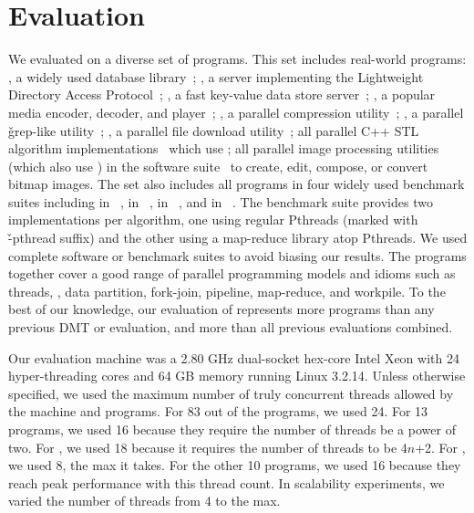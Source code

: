 \section{Evaluation} \label{sec:parrot-eval}

We evaluated \parrot on a diverse set of \nprog programs. This set
includes \nrealprog real-world programs: \bdb, a widely used database
library~\cite{berkeleydb}; \openldap, a server implementing the
Lightweight Directory Access Protocol~\cite{openldap}; \redis, a fast
key-value data store server~\cite{redis}; \mplayer, a popular media
encoder, decoder, and player~\cite{mplayer}; \pbzip, a parallel
compression utility~\cite{pbzip2}; \pfscan, a parallel \v{grep}-like
utility~\cite{pfscan}; \aget, a parallel file download
utility~\cite{aget}; all \nstl parallel C++ STL algorithm
implementations~\cite{parallel-stl} which use \openmp; all \nimagick
parallel image processing utilities (which also use \openmp) in the
\imagick software suite~\cite{imagick} to create, edit, compose, or
convert bitmap images.  The set also includes all \nbenchmarks programs in
four widely used benchmark suites including \nparsec in
\parsec~\cite{parsec}, \nphoenix in
\phoenix~\cite{phoenix-benchmarks}, \nsplash in
\splashx~\cite{splashx}, and \nnpb in \npb~\cite{npb}.  The \phoenix
benchmark suite provides two implementations per algorithm, one using
regular Pthreads (marked with \v{-pthread} suffix) and the other using
a map-reduce library atop Pthreads.  We used complete software or
benchmark suites to avoid biasing our results.  The programs together
cover a good range of parallel programming models and idioms such as
threads, \openmp, data partition, fork-join, pipeline, map-reduce, and
workpile.  To the best of our knowledge, our evaluation of \parrot
represents \overeach more programs than any previous DMT or \smt
evaluation, and \overcombined more than all previous
evaluations combined.

Our evaluation machine was a 2.80 GHz dual-socket hex-core Intel Xeon
with 24 hyper-threading cores and 64 GB memory
running Linux 3.2.14.  Unless otherwise specified, we used the maximum
number of truly concurrent threads allowed by the machine and programs.  For 83
out of the \nprog programs, we used 24.  For 13 programs, we used 16
because they require the number of threads be a power of 
two. For \ferret, we used 18 because it requires
the number of threads to be 4$n$+2. For \mplayer, we used 8,
the max it takes. For the other
10 programs, we used 16 because they reach peak performance with
this thread count.  In scalability experiments, we varied the number of
threads from 4 to the max.

